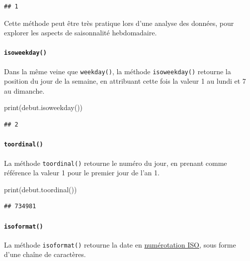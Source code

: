 \documentclass[12pt,]{book}
\newenvironment{Shaded}{\begin{snugshade}}{\end{snugshade}}
\newcommand{\BuiltInTok}[1]{#1}
\newcommand{\NormalTok}[1]{#1}
\let\oldparagraph\paragraph
\renewcommand{\paragraph}[1]{\oldparagraph{#1}\mbox{}}
\numberwithin{equation}{section}
\numberwithin{countremarque}{section}
\let\BeginKnitrBlock\begin \let\EndKnitrBlock\end
\begin{document}
\begin{lstlisting}
## 1
\end{lstlisting}

\BeginKnitrBlock{remarque}
Cette méthode peut être très pratique lors d'une analyse des données,
pour explorer les aspects de saisonnalité hebdomadaire.
\EndKnitrBlock{remarque}

\paragraph{\texorpdfstring{\texttt{isoweekday()}}{isoweekday()}}\label{isoweekday}

Dans la même veine que \texttt{weekday()}, la méthode
\texttt{isoweekday()} retourne la position du jour de la semaine, en
attribuant cette fois la valeur 1 au lundi et 7 au dimanche.

\begin{Shaded}
\begin{Highlighting}[]
\BuiltInTok{print}\NormalTok{(debut.isoweekday())}
\end{Highlighting}
\end{Shaded}

\begin{lstlisting}
## 2
\end{lstlisting}

\paragraph{\texorpdfstring{\texttt{toordinal()}}{toordinal()}}\label{toordinal}

La méthode \texttt{toordinal()} retourne le numéro du jour, en prenant
comme référence la valeur 1 pour le premier jour de l'an 1.

\begin{Shaded}
\begin{Highlighting}[]
\BuiltInTok{print}\NormalTok{(debut.toordinal())}
\end{Highlighting}
\end{Shaded}

\begin{lstlisting}
## 734981
\end{lstlisting}

\paragraph{\texorpdfstring{\texttt{isoformat()}}{isoformat()}}\label{isoformat}

La méthode \texttt{isoformat()} retourne la date en
\href{https://fr.wikipedia.org/wiki/Num\%C3\%A9rotation_ISO_des_semaines}{numérotation
ISO}, sous forme d'une chaîne de caractères.
\end{document}
